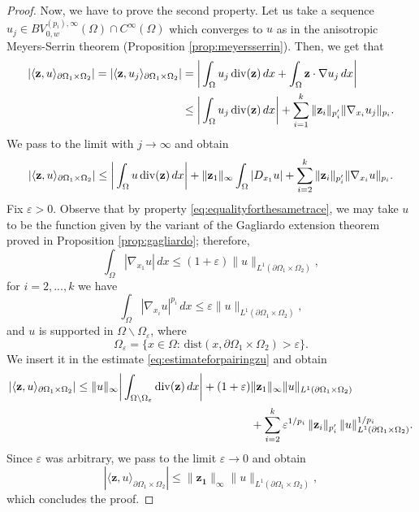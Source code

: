\documentclass[reqno,12pt]{amsart}
\def\z{{\bf z}}
\numberwithin{equation}{section}
\begin{document}
\begin{proof}
Now, we have to prove the second property. Let us take a sequence $u_j \in BV_{0,w}^{(p_i), \infty}(\Omega) \cap C^\infty(\Omega)$ which converges to $u$ as in the anisotropic Meyers-Serrin theorem (Proposition \ref{prop:meyersserrin}). Then, we get that
\begin{align}
|\langle \mathbf{z}, u \rangle_{\partial\Omega_1 \times \Omega_2}| = |\langle \mathbf{z}, u_j \rangle_{\partial\Omega_1 \times \Omega_2}| &= \bigg| \int_\Omega u_j \, \mathrm{div}(\mathbf{z}) \, dx + \int_\Omega \mathbf{z} \cdot \nabla u_j \, dx \bigg| \\
&\leq \bigg| \int_\Omega u_j \, \mathrm{div}(\mathbf{z}) \, dx \bigg| +  \sum_{i = 1}^k \| \z_i \|_{p'_i}  \| \nabla_{x_i} u_j \|_{p_i}.
\end{align}
We pass to the limit with $j \rightarrow \infty$ and obtain
\begin{equation}\label{eq:estimateforpairingzu}
|\langle \mathbf{z}, u \rangle_{\partial\Omega_1 \times \Omega_2}| \leq \bigg| \int_\Omega u \, \mathrm{div}(\mathbf{z}) \, dx \bigg| + \| \z_1 \|_\infty \int_\Omega |D_{x_1} u| + \sum_{i = 2}^k \| \z_i \|_{p'_i}  \| \nabla_{x_i} u \|_{p_i}.    
\end{equation}
Fix $\varepsilon > 0$. Observe that by property \eqref{eq:equalityforthesametrace}, we may take $u$ to be the function given by the variant of the Gagliardo extension theorem proved in Proposition \ref{prop:gagliardo}; therefore,
$$ \int_\Omega |\nabla_{x_1} u| \, dx \leq (1 + \varepsilon) \| u \|_{L^1(\partial\Omega_1 \times \Omega_2)},$$
for $i = 2, ..., k$ we have
$$ \int_\Omega |\nabla_{x_i} u|^{p_i} \, dx \leq \varepsilon \| u \|_{L^1(\partial\Omega_1 \times \Omega_2)},$$
and $u$ is supported in $\Omega \backslash \Omega_\varepsilon$, where
$$ \Omega_\varepsilon = \{ x \in \Omega: \, \mathrm{dist}(x, \partial\Omega_1 \times \Omega_2) > \varepsilon \}.$$
We insert it in the estimate \eqref{eq:estimateforpairingzu} and obtain
\begin{align}
|\langle \mathbf{z}, u \rangle_{\partial\Omega_1 \times \Omega_2}| \leq \| u \|_\infty \bigg| \int_{\Omega \backslash \Omega_\varepsilon} \mathrm{div}(\mathbf{z}) \, dx \bigg| + (1 + \varepsilon) &\| \z_1 \|_{\infty} \| u \|_{L^1(\partial\Omega_1 \times \Omega_2)} \\
&+ \sum_{i=2}^k \varepsilon^{1/p_i} \, \| \z_i \|_{p'_i} \, \| u \|_{L^1(\partial\Omega_1 \times \Omega_2)}^{1/p_i}.    
\end{align}
Since $\varepsilon$ was arbitrary, we pass to the limit $\varepsilon \rightarrow 0$ and obtain
$$ |\langle \mathbf{z}, u \rangle_{\partial\Omega_1 \times \Omega_2}| \leq \| \mathbf{z_1} \|_{\infty} \| u \|_{L^1(\partial\Omega_1 \times \Omega_2)}, $$
which concludes the proof.
\end{proof}
\end{document}
